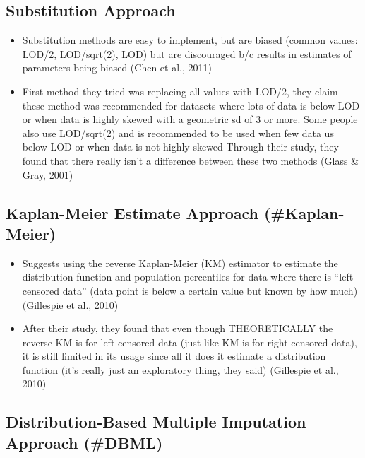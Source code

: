 \documentclass[12pt, twoside]{amherstthesis}
\begin{document}
\hypertarget{Substitution}{%
\subsection{Substitution Approach}\label{Substitution}}
\begin{itemize}
\item
  Substitution methods are easy to implement, but are biased (common values: LOD/2, LOD/sqrt(2), LOD) but are discouraged b/c results in estimates of parameters being biased (Chen et al., 2011)
\item
  First method they tried was replacing all values with LOD/2, they claim these method was recommended for datasets where lots of data is below LOD or when data is highly skewed with a geometric sd of 3 or more. Some people also use LOD/sqrt(2) and is recommended to be used when few data us below LOD or when data is not highly skewed Through their study, they found that there really isn't a difference between these two methods (Glass \& Gray, 2001)
\end{itemize}
\hypertarget{kaplan-meier-estimate-approach-kaplan-meier}{%
\subsection{Kaplan-Meier Estimate Approach (\#Kaplan-Meier)}\label{kaplan-meier-estimate-approach-kaplan-meier}}
\begin{itemize}
\item
  Suggests using the reverse Kaplan-Meier (KM) estimator to estimate the distribution function and population percentiles for data where there is ``left-censored data'' (data point is below a certain value but known by how much) (Gillespie et al., 2010)
\item
  After their study, they found that even though THEORETICALLY the reverse KM is for left-censored data (just like KM is for right-censored data), it is still limited in its usage since all it does it estimate a distribution function (it's really just an exploratory thing, they said) (Gillespie et al., 2010)
\end{itemize}
\hypertarget{distribution-based-multiple-imputation-approach-dbml}{%
\subsection{Distribution-Based Multiple Imputation Approach (\#DBML)}\label{distribution-based-multiple-imputation-approach-dbml}}
\end{document}
